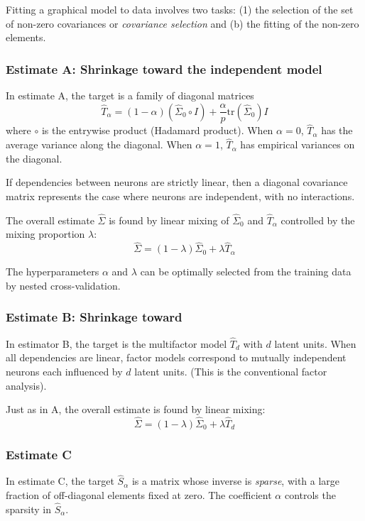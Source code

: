 Fitting a graphical model to data involves two tasks: (1) the selection of the set of non-zero covariances or \emph{covariance selection} \cite{Dempster:1972} and (b) the fitting of the non-zero elements.

\subsubsection*{Estimate A: Shrinkage toward the independent model}
In estimate A, the target is a family of diagonal matrices 
\begin{equation}
\hat T_\alpha = (1-\alpha)(\hat\Sigma_0 \circ I) + \frac \alpha p \mbox{tr}(\hat \Sigma_0)I
\end{equation}
where $\circ$ is the entrywise product (Hadamard product). When $\alpha=0$, $\hat T_\alpha$ has the average variance along the diagonal. When $ \alpha=1$, $ \hat T_\alpha$ has empirical variances on the diagonal.

If dependencies between neurons are strictly linear, then a diagonal covariance matrix represents the case where neurons are independent, with no interactions.

The overall estimate $\hat\Sigma$ is found by linear mixing of $\hat\Sigma_0$ and $ \hat T_\alpha$ controlled by the mixing proportion $\lambda$:
\begin{equation}
\hat\Sigma = (1-\lambda)\hat\Sigma_0 + \lambda\hat T_\alpha 
\end{equation}

The hyperparameters $ \alpha$ and $ \lambda$ can be optimally selected from the training data by nested cross-validation.

\subsubsection*{Estimate B: Shrinkage toward }
In estimator B, the target is the multifactor model $ \hat T_d$ with $ d$ latent units. When all dependencies are linear, factor models correspond to mutually independent neurons each influenced by $ d$ latent units. (This is  the conventional factor analysis).

Just as in A, the overall estimate is found by linear mixing:
\begin{equation}
\hat\Sigma = (1-\lambda)\hat\Sigma_0 + \lambda\hat T_d
\end{equation}

\subsubsection*{Estimate C}
In estimate C, the target $ \hat S_\alpha$ is a matrix whose inverse is \emph{sparse}, with a large fraction of off-diagonal elements fixed at zero. The coefficient $ \alpha$ controls the sparsity in $ \hat S_\alpha$.


